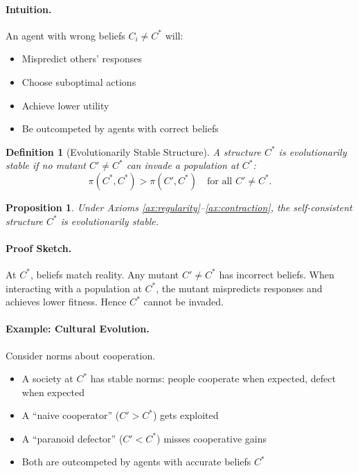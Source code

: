 \documentclass[12pt,a4paper]{article}
\newtheorem{proposition}[theorem]{Proposition}
\newtheorem{definition}[theorem]{Definition}
\begin{document}
\paragraph{Intuition.}
An agent with wrong beliefs $C_i \neq C^*$ will:
\begin{itemize}
  \item Mispredict others' responses
  \item Choose suboptimal actions
  \item Achieve lower utility
  \item Be outcompeted by agents with correct beliefs
\end{itemize}

\begin{definition}[Evolutionarily Stable Structure]
A structure $C^*$ is \emph{evolutionarily stable} if 
no mutant $C' \neq C^*$ can invade a population at $C^*$:
\[
  \pi(C^*, C^*) > \pi(C', C^*)
  \quad \text{for all } C' \neq C^*.
\]
\end{definition}

\begin{proposition}
Under Axioms \ref{ax:regularity}--\ref{ax:contraction},
the self-consistent structure $C^*$ is evolutionarily stable.
\end{proposition}

\paragraph{Proof Sketch.}
At $C^*$, beliefs match reality. Any mutant $C' \neq C^*$ has incorrect beliefs.
When interacting with a population at $C^*$, the mutant mispredicts responses
and achieves lower fitness. Hence $C^*$ cannot be invaded.

\paragraph{Example: Cultural Evolution.}
Consider norms about cooperation.
\begin{itemize}
  \item A society at $C^*$ has stable norms: people cooperate when expected, defect when expected
  \item A ``naive cooperator'' ($C' > C^*$) gets exploited
  \item A ``paranoid defector'' ($C' < C^*$) misses cooperative gains
  \item Both are outcompeted by agents with accurate beliefs $C^*$
\end{itemize}
\end{document}
